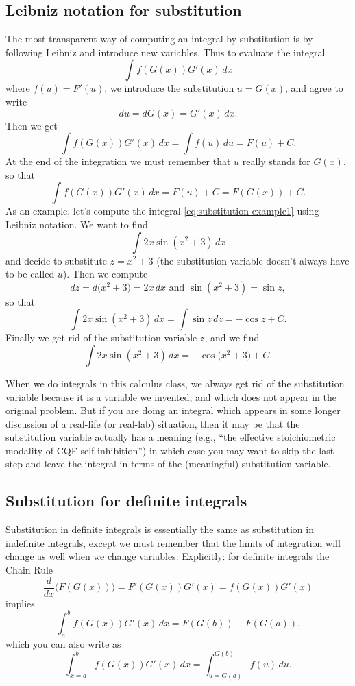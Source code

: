 \subsection{Leibniz notation for substitution} %
\label{sec:leibniz-notation}
The most transparent way of computing an integral by substitution is
by following Leibniz and introduce new variables.  Thus to evaluate the
integral
\[
\int f(G(x)) G'(x)\,d x
\]
where $f(u) = F'(u)$, we introduce the substitution $u=G(x)$, and
agree to write
\[
d u = d G(x) = G'(x)\,d x.
\]
Then we get
\[
\int f(G(x)) G'(x)\,d x = \int f(u) \,d u = F(u)+C.
\]
At the end of the integration we must remember that $u$ really stands
for $G(x)$, so that
\[
\int f(G(x)) G'(x)\,d x = F(u)+C = F(G(x))+C.
\]
As an example, let's compute the integral \eqref{eq:substitution-example1}
using Leibniz notation.  We want to find
\[
\int 2x\sin (x^2+3)\,d x
\]
and decide to substitute $z = x^2+3$ (the substitution variable
doesn't always have to be called $u$).  Then we compute
\[
dz = d\bigl(x^2+3\bigr) = 2x\, dx \text{ and } \sin(x^2+3) = \sin z,
\]
so that
\[
\int 2x\sin (x^2+3)\,d x = \int \sin z\, dz = -\cos z +C.
\]
Finally we get rid of the substitution variable $z$, and we find
\[
\int 2x\sin (x^2+3)\,d x = -\cos\bigl(x^2+3\bigr)+C.
\]

When we do integrals in this calculus class, we always get rid of the
substitution variable because it is a variable we invented, and which
does not appear in the original problem.  But if you are doing an
integral which appears in some longer discussion of a real-life (or
real-lab) situation, then it may be that the substitution variable
actually has a meaning (e.g., ``the effective stoichiometric modality
of CQF self-inhibition'') in which case you may want to skip the last
step and leave the integral in terms of the (meaningful) substitution
variable.


\subsection{Substitution for definite integrals} %
Substitution in definite integrals is essentially the same as substitution in
indefinite integrals, except we must remember that the limits of integration
will change as well when we change variables. Explicitly: for definite integrals
the Chain Rule
\[
\frac d{dx}\bigl(F(G(x))\bigr) = F'(G(x)) G'(x) = f(G(x)) G'(x)
\]
implies
\[
\int_a^b f(G(x)) G'(x)\,d x = F(G(b))-F(G(a)).
\]
which you can also write as
\begin{equation}
  \label{eq:substitution-definite-int}
  \int_{x=a}^b f(G(x)) G'(x)\,d x  = \int_{u=G(a)}^{G(b)} f(u)\,d u.
\end{equation}
